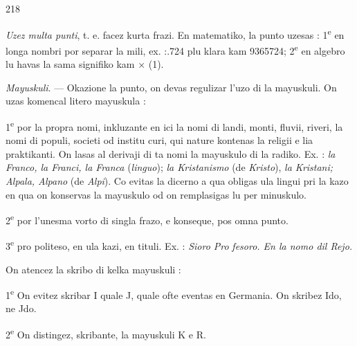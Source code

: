 \begin{VUpage}[222]{218}

\VUcontinue
\textit{Uzez multa punti}, t. e. facez kurta frazi. En matematiko, la\nl
punto uzesas : 1\textsuperscript{e} en longa nombri por separar la mili, ex. :.724 plu klara kam 9365724; 2\textsuperscript{e} en algebro lu havas\nl
la sama signifiko kam × (1).

\textit{Mayuskuli}. --- Okazione la punto, on devas regulizar l'uzo\nl
di la mayuskuli. On uzas komencal litero mayuskula :\parplein

1\textsuperscript{e} por la propra nomi, inkluzante en ici la nomi di landi,\nl
monti, fluvii, riveri, la nomi di populi, societi od institu\cc
curi, qui nature kontenas la religii e lia praktikanti. On\nl
lasas al derivaji di ta nomi la mayuskulo di la radiko.\nl
Ex. : \textit{la Franco, la Franci, la Franca} (\textit{linguo}); \textit{la Kristanismo}\nl
(de \textit{Kristo}), \textit{la Kristani; Alpala, Alpano} (de \textit{Alpi}). Co evitas\nl
la dicerno a qua obligas ula lingui pri la kazo en qua on\nl
konservas la mayuskulo od on remplasigas lu per minuskulo.\parplein

2\textsuperscript{e} por l'unesma vorto di singla frazo, e konseque, pos\nl
omna punto.

3\textsuperscript{e} pro politeso, en ula kazi, en tituli. Ex. : \textit{Sioro Pro}\cc
\textit{fesoro. En la nomo dil Rejo.}

On atencez la skribo di kelka mayuskuli :

1\textsuperscript{e} On evitez skribar I quale J, quale ofte eventas en\nl
Germania. On skribez Ido, ne Jdo.

2\textsuperscript{e} On distingez, skribante, la mayuskuli K e R.


\end{VUpage}
